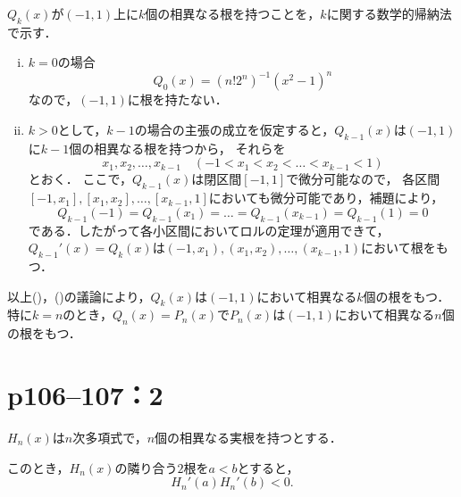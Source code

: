 \begin{tproof}
    $Q_k (x)$が$(-1,1)$上に$k$個の相異なる根を持つことを，$k$に関する数学的帰納法で示す．
    \begin{enumerate}[(i)]
        \item $k=0$の場合
              \[
                  Q_0(x)= (n! 2^n)^{-1} (x^2-1)^n
              \]
              なので，$(-1,1)$に根を持たない．
        \item $k>0$として，$k-1$の場合の主張の成立を仮定すると，$Q_{k-1}(x)$は$(-1,1)$に$k-1$個の相異なる根を持つから，
              それらを
              \[
                  x_1,x_2,\dots,x_{k-1}\quad (-1<x_1<x_2<\dots <x_{k-1}<1)
              \]とおく．
              ここで，$Q_{k-1} (x)$は閉区間$[-1,1]$で微分可能なので，
              各区間$[-1,x_1],[x_1,x_2],\dots,[x_{k-1},1]$においても微分可能であり，補題により，
              \[
                  Q_{k-1} (-1) = Q_{k-1}(x_1)=\dots = Q_{k-1}(x_{k-1})=Q_{k-1}(1)=0
              \]
              である．したがって各小区間においてロルの定理が適用できて，$Q_{k-1}' (x)=Q_k(x)$は$(-1,x_1),(x_1,x_2),\dots,(x_{k-1},1)$において根をもつ．
    \end{enumerate}
    以上()，()の議論により，$Q_k (x)$は$(-1,1)$において相異なる$k$個の根をもつ．
    特に$k=n$のとき，$Q_n (x)=P_n(x)$で$P_n (x)$は$(-1,1)$において相異なる$n$個の根をもつ．
\end{tproof}

\newpage

\section*{p106--107：2}


\begin{lemma}{}{}
    $H_n(x)$は$n$次多項式で，$n$個の相異なる実根を持つとする．

    このとき，$H_n (x)$の隣り合う$2$根を$a < b$とすると，
    \[
        H_n'(a) H_n'(b)<0.
    \]
\end{lemma}

